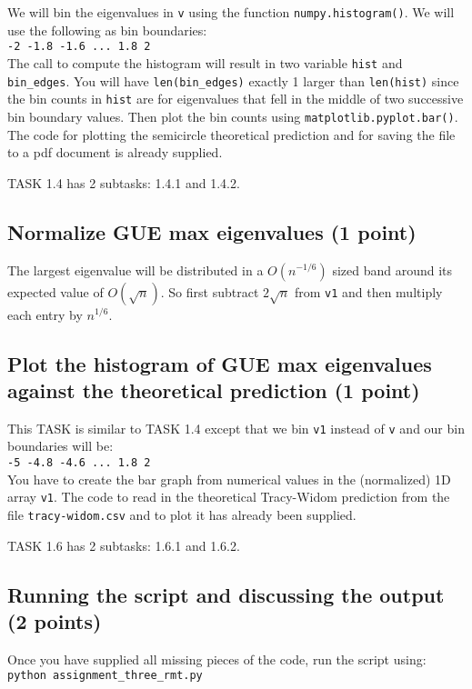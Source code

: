 \documentclass{article}
\begin{document}
We will bin the eigenvalues in \verb#v# using the function \verb#numpy.histogram()#. We will use the following as bin boundaries:\\
\verb#-2 -1.8 -1.6 ... 1.8 2# \\
The call to compute the histogram will result in two variable \verb#hist# and \verb#bin_edges#. You will have \verb#len(bin_edges)#
exactly 1 larger than \verb#len(hist)# since the bin counts in \verb#hist# are for eigenvalues that fell in the middle of two successive
bin boundary values. Then plot the bin counts using \verb#matplotlib.pyplot.bar()#. The code for plotting the semicircle theoretical
prediction and for saving the file to a pdf document is already supplied.

TASK 1.4 has 2 subtasks: 1.4.1 and 1.4.2.

\subsection{Normalize GUE max eigenvalues (1 point)}

The largest eigenvalue will be distributed in a $O(n^{-1/6})$ sized band around its expected value of $O(\sqrt{n})$. So first subtract $2\sqrt{n}$ from
\verb#v1# and then multiply each entry by $n^{1/6}$.

\subsection{Plot the histogram of GUE max eigenvalues against the theoretical
prediction (1 point)}

This TASK is similar to TASK 1.4 except that we bin \verb#v1# instead of \verb#v# and our bin boundaries will be:\\
\verb#-5 -4.8 -4.6 ... 1.8 2# \\
You have to create the bar graph from numerical values in the (normalized) 1D array \verb#v1#. The code to read in the
theoretical Tracy-Widom prediction from the file \verb#tracy-widom.csv# and to plot it has already been supplied.

TASK 1.6 has 2 subtasks: 1.6.1 and 1.6.2.

\subsection{Running the script and discussing the output (2 points)}

Once you have supplied all missing pieces of the code, run the script using:\\
{\tt python assignment\_three\_rmt.py}
\end{document}
